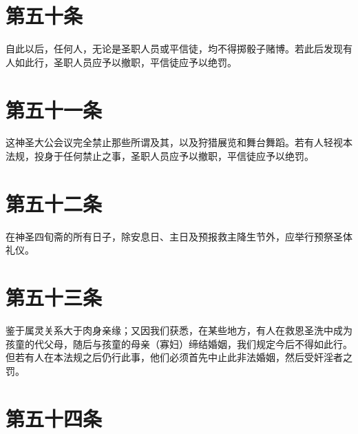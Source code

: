 
\section{第五十条}

自此以后，任何人，无论是圣职人员或平信徒，均不得掷骰子赌博。若此后发现有人如此行，圣职人员应予以撤职，平信徒应予以绝罚。\par


\section{第五十一条}

这神圣大公会议完全禁止那些所谓及其，以及狩猎展览和舞台舞蹈。若有人轻视本法规，投身于任何禁止之事，圣职人员应予以撤职，平信徒应予以绝罚。\par


\section{第五十二条}

在神圣四旬斋的所有日子，除安息日、主日及预报救主降生节外，应举行预祭圣体礼仪。\par


\section{第五十三条}

鉴于属灵关系大于肉身亲缘；又因我们获悉，在某些地方，有人在救恩圣洗中成为孩童的代父母，随后与孩童的母亲（寡妇）缔结婚姻，我们规定今后不得如此行。但若有人在本法规之后仍行此事，他们必须首先中止此非法婚姻，然后受奸淫者之罚。\par


\section{第五十四条}

